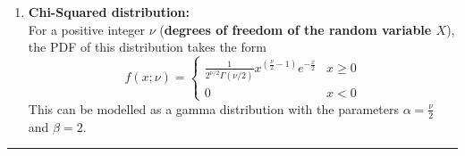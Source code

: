 \documentclass[a4paper]{article}
\begin{document}
\begin{itemize}
\begin{enumerate}
    \item \textbf{Chi-Squared distribution:}\\
    For a positive integer $\nu$ (\textbf{degrees of freedom of the random variable $X$}), the PDF of this distribution takes the form
    \begin{equation*}
        f(x; \nu) = \begin{cases}
        \frac{1}{2^{\nu/2}\Gamma(\nu/2)}x^{\left(\frac{\nu}{2}-1\right)}e^{-\frac{x}{2}} & x\geq 0\\
        0 & x < 0
        \end{cases}
    \end{equation*}
        This can be modelled as a gamma distribution with the parameters $\alpha = \frac{\nu}{2}$ and $\beta = 2$.
    \end{enumerate}
        
\end{itemize}
\par\noindent\rule{\textwidth}{0.4pt}
\end{document}
